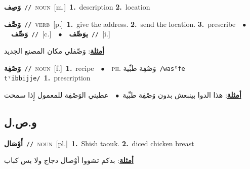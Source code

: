 \documentclass[10pt,a4paper,twoside]{article} %
\begin{document}
\begin{multicols}{2}
{\setlength\topsep{0pt}\textbf{\foreignlanguage{arabic}{وَصِف}}\ {\color{gray}\texttt{//}\color{black}}\ \textsc{noun}\ [m.]\ \textbf{1.}~description  \textbf{2.}~location\ } \vspace{2mm}

{\setlength\topsep{0pt}\textbf{\foreignlanguage{arabic}{وَصَّف}}\ {\color{gray}\texttt{//}\color{black}}\ \textsc{verb}\ [p.]\ \textbf{1.}~give the address.  \textbf{2.}~send the location.  \textbf{3.}~prescribe\ \ $\bullet$\ \ \setlength\topsep{0pt}\textbf{\foreignlanguage{arabic}{وَصِّف}}\ {\color{gray}\texttt{//}\color{black}}\ [c.]\ \ $\bullet$\ \ \setlength\topsep{0pt}\textbf{\foreignlanguage{arabic}{يوَصِّف}}\ {\color{gray}\texttt{//}\color{black}}\ [i.]\  \begin{flushright}\color{gray}\foreignlanguage{arabic}{\textbf{\underline{\foreignlanguage{arabic}{أمثلة}}}: وَصِّفلي مكان المصنع الجديد}\end{flushright}\color{black}} \vspace{2mm}

{\setlength\topsep{0pt}\textbf{\foreignlanguage{arabic}{وَصْفِة}}\ {\color{gray}\texttt{//}\color{black}}\ \textsc{noun}\ [f.]\ \textbf{1.}~recipe\ \ $\bullet$\ \ \textsc{ph.} \color{gray} \foreignlanguage{arabic}{وَصْفِة طبِّية}\color{black}\ {\color{gray}\texttt{/{\sffamily wasˤfe tˤibbijje}/}\color{black}}\ \textbf{1.}~prescription\  \begin{flushright}\color{gray}\foreignlanguage{arabic}{\textbf{\underline{\foreignlanguage{arabic}{أمثلة}}}: هذا الدوا بينبعش بدون وَصْفِة طبِّية\ $\bullet$\ \  عطيني الوَصْفِة للمعمول إِذا سمحت}\end{flushright}\color{black}} \vspace{2mm}

\vspace{-3mm}
\subsection*{\color{blue}\foreignlanguage{arabic}{و.ص.ل}\color{blue}{}} 

{\setlength\topsep{0pt}\textbf{\foreignlanguage{arabic}{أَوْصَال}}\ {\color{gray}\texttt{//}\color{black}}\ \textsc{noun}\ [pl.]\ \textbf{1.}~Shish taouk.  \textbf{2.}~diced chicken breast\  \begin{flushright}\color{gray}\foreignlanguage{arabic}{\textbf{\underline{\foreignlanguage{arabic}{أمثلة}}}: بدكم تشووا أوْصال دجاج ولا بس كباب}\end{flushright}\color{black}} \vspace{2mm}


\end{multicols}
\end{document}
